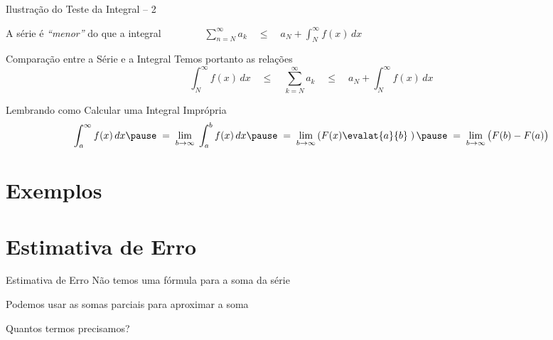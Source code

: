 \documentclass[fleqn,utf8,aspectratio=169,12pt]{beamer}
\begin{document}
\begin{frame}{Ilustração do Teste da Integral -- 2}
  \begin{center}
    \scalebox{.9}{}
  \end{center}

  \pause
  A série é \emph{``menor''} do que a integral
  \pause
  \(
    \qquad\qquad
    \sum_{n=N}^\infty a_k
    \quad\leq\quad
    a_{N} + \int_{N}^\infty f(x)\,dx
  \)
\end{frame}

\begin{frame}{Comparação entre a Série e a Integral}
  Temos portanto as relações
  \[
    \int_{N}^{\infty} f(x)\,dx
    \quad\leq\quad
    \sum_{k=N}^{\infty} a_k
    \quad\leq\quad
    a_N + \int_{N}^{\infty} f(x)\,dx
  \]
\end{frame}

\begin{frame}{Lembrando como Calcular uma Integral Imprópria}
  \[
    \int_{a}^{\infty} f(x)\,dx
    \pause \;=\;
    \lim_{b\to\infty} \; \int_{a}^{b} f(x)\,dx
    \pause \;=\;
    \lim_{b\to\infty} \left( F(x) \evalat{a}{b} \; \right)
    \pause \;=\;
    \lim_{b\to\infty} \big( F(b) - F(a) \big)
  \]
\end{frame}

\section{Exemplos}




\section{Estimativa de Erro}

\begin{frame}{Estimativa de Erro}
  Não temos uma fórmula para a soma da série

  \pause
  \vspace{\baselineskip}
  Podemos usar as somas parciais para aproximar a soma

  \pause
  \vspace{\baselineskip}
  Quantos termos precisamos?
\end{frame}
\end{document}
